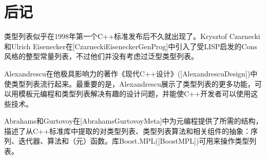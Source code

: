 \section{后记}
类型列表似乎在1998年第一个C++标准发布后不久就出现了。Krysztof Czarnecki和Ulrich Eisenecker在[CzarneckiEiseneckerGenProg]中引入了受LISP启发的Cons风格的整型常量列表，不过他们并没有考虑过泛型类型列表。

Alexandrescu在他极具影响力的著作《现代C++设计》([AlexandrescuDesign])中使类型列表流行起来。最重要的是，Alexandrescu展示了类型列表的更多功能，可以用模板元编程和类型列表解决有趣的设计问题，并能使C++开发者可以使用这些技术。

Abrahams和Gurtovoy在[AbrahamsGurtovoyMeta]中为元编程提供了所需的结构，描述了从C++标准库中提取的对类型列表、类型列表算法和相关组件的抽象：序列、迭代器、算法和（元）函数。库Boost.MPL([BoostMPL])可用来操作类型列表。